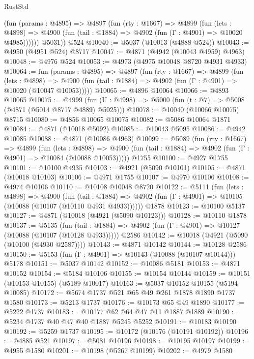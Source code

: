 \begin{lexlean}{RustStd}
\begin{coremodule}
          (fun (params : @4895) =>
          @4897
            (fun (rty : @1667) =>
            @4899
              (fun (lets : @4898) =>
              @4900 (fun (tail : @1884) => @4902 (fun (Γ : @4901) => @10020 @4985))))))
        @5031))
    @524
@10040 := @5037 (@10013 (@4888 @524))
@10043 := @4950 (@4951 @524) @8717
@10047 := @4871 (@4942 (@10043 @4959) @4963)
@10048 := @4976 @524
@10053 := @4973 (@4975 @10048 @8720 @4931 @4933)
@10064 := fun (params : @4895) =>
  @4897
    (fun (rty : @1667) =>
    @4899
      (fun (lets : @4898) =>
      @4900 (fun (tail : @1884) => @4902 (fun (Γ : @4901) => @10020 (@10047 @10053)))))
@10065 := @4896 @10064
@10066 := @4893 @10065
@10075 := @4999 (fun (U : @4998) => @5000 (fun (t : @7) => @5008 (@4871 (@5014 @8717 @4889) @5025)))
@10078 := @10040 (@10066 @10075) @8715
@10080 := @4856 @10065 @10075
@10082 := @5086 @10064 @1871
@10084 := @4871 (@10018 @5092)
@10085 := @10043 @5095
@10086 := @4942 @10085
@10088 := @4871 (@10086 @4963)
@10099 := @5089
    (fun (rty : @1667) =>
    @4899
      (fun (lets : @4898) =>
      @4900 (fun (tail : @1884) => @4902 (fun (Γ : @4901) => @10084 (@10088 @10053)))))
    @1755
@10100 := @4927 @1755
@10101 := @10100 @4935
@10103 := @4921 (@5090 @10101)
@10105 := @4871 (@10018 @10103)
@10106 := @4971 @1755
@10107 := @4970 @10106
@10108 := @4974 @10106
@10110 := @10108 @10048 @8720
@10122 := @5111
    (fun (lets : @4898) =>
    @4900
      (fun (tail : @1884) =>
      @4902 (fun (Γ : @4901) => @10105 (@10088 (@10107 (@10110 @4931 @4933))))))
    @1878
@10123 := @10100 @5137
@10127 := @4871 (@10018 (@4921 (@5090 @10123)))
@10128 := @10110 @1878
@10137 := @5135
    (fun (tail : @1884) => @4902 (fun (Γ : @4901) => @10127 (@10088 (@10107 (@10128 @4933)))))
    @2586
@10142 := @10018 (@4921 (@5090 (@10100 (@4930 @2587))))
@10143 := @4871 @10142
@10144 := @10128 @2586
@10150 := @5153 (fun (Γ : @4901) => @10143 (@10088 (@10107 @10144))) @5178
@10151 := @5037 @10142
@10152 := @10086 @5181
@10153 := @4871 @10152
@10154 := @5184 @10106
@10155 := @10154 @10144
@10159 := @10151 (@10153 @10155) (@5189 @10017)
@10163 := @5037 @10152 @10155 (@5194 @10085)
@10172 := @5674 @1737 @521 @65 @49 @261 @1878 @1890 @1737 @1580
@10173 := @5213 @1737
@10176 := @10173 @65 @49 @1890
@10177 := @5222 @1737
@10183 := @10177 @62 @64 @47 @11 @1887 @1889
@10190 := @5234 @1737 @40 @47 @40 @1887 @5245 @5252
@10191 := @10183 @10190
@10192 := @5259 @1737
@10195 := @10172 (@10176 (@10191 @10192))
@10196 := @4885 @521
@10197 := @5081 @10196
@10198 := @10195 @10197
@10199 := @4955 @1580
@10201 := @10198 (@5267 @10199)
@10202 := @4979 @1580

\end{coremodule}
\end{lexlean}
